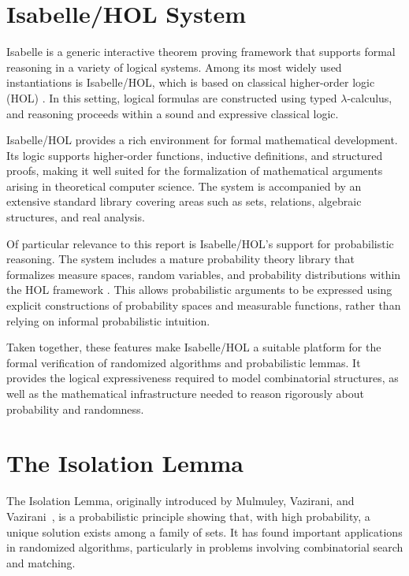 \section{Isabelle/HOL System}

Isabelle is a generic interactive theorem proving framework that supports formal reasoning in a variety of logical systems.
Among its most widely used instantiations is Isabelle/HOL, which is based on classical higher-order logic (HOL) \cite{nipkow2002isabelle}.
In this setting, logical formulas are constructed using typed $\lambda$-calculus, and reasoning proceeds within a sound and expressive classical logic.

Isabelle/HOL provides a rich environment for formal mathematical development.
Its logic supports higher-order functions, inductive definitions, and structured proofs, making it well suited for the formalization of mathematical arguments arising in theoretical computer science.
The system is accompanied by an extensive standard library covering areas such as sets, relations, algebraic structures, and real analysis.

Of particular relevance to this report is Isabelle/HOL's support for probabilistic reasoning.
The system includes a mature probability theory library that formalizes measure spaces, random variables, and probability distributions within the HOL framework \cite{isabelleprob}.
This allows probabilistic arguments to be expressed using explicit constructions of probability spaces and measurable functions, rather than relying on informal probabilistic intuition.

Taken together, these features make Isabelle/HOL a suitable platform for the formal verification of randomized algorithms and probabilistic lemmas.
It provides the logical expressiveness required to model combinatorial structures, as well as the mathematical infrastructure needed to reason rigorously about probability and randomness.

\section{The Isolation Lemma}
The Isolation Lemma, originally introduced by Mulmuley, Vazirani, and Vazirani~\cite{mulmuley1987matching}, is a probabilistic principle showing that, with high probability, a unique solution exists among a family of sets.
It has found important applications in randomized algorithms, particularly in problems involving combinatorial search and matching.

